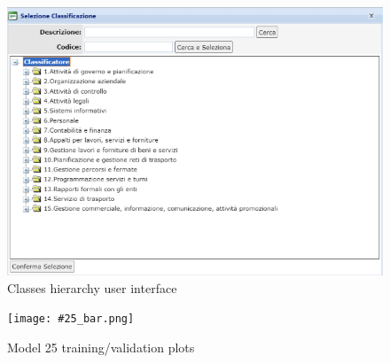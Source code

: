 \documentclass[12pt]{article}
\begin{document}
\begin{figure}[ht!]
    \begin{adjustwidth}{-2cm}{}
    	    \begin{center}
        \includegraphics[width=1.3\textwidth]{class_interface.png}
            \end{center}
    \end{adjustwidth}
    \captionsetup{justification = centering}
    \caption{Classes hierarchy user interface}
    \label{fig:classinterface}
\end{figure}

\pagebreak

\begin{figure}[ht!]
        \begin{adjustwidth}{-3.2cm}{}
    	    \begin{center}
        \texttt{[image: \#25\_bar.png]}
            \end{center}
	    \end{adjustwidth}
        \caption{Model 25 training/validation plots}
        \label{fig:model25}
\end{figure}
\end{document}
